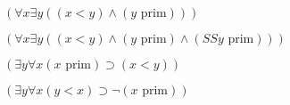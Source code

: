 $(\forall x \exists y ((x<y)\wedge(y \text{ prim})))$

$(\forall x \exists y ((x<y)\wedge(y \text{ prim})\wedge(SSy \text{ prim})))$

$(\exists y \forall x (x \text{ prim}) \supset (x<y)) $

$(\exists y \forall x (y<x) \supset \neg (x \text{ prim}))$
